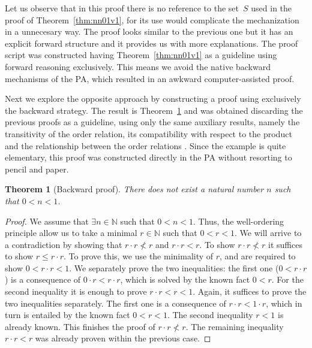 \documentclass[11pt,letterpaper]{article}
\newtheorem{theorem}{Theorem}
\begin{document}
Let us observe that in this proof there is no reference to the set~$S$ used in 
the proof of Theorem~\ref{thm:nn01v1}, for its use would complicate the 
mechanization in a unnecesary way. 
The proof looks similar to the previous one but it has an explicit forward 
structure and it provides us with more explanations. The proof script was 
constructed having Theorem~\ref{thm:nn01v1} as a guideline using forward 
reasoning exclusively. This means we avoid the native backward mechanisms of 
the PA, which resulted in an awkward computer-assisted proof.

Next we explore the opposite approach by constructing a proof using 
exclusively the backward strategy. The result is Theorem~\ref{thm:nn01vb} and 
was obtained discarding the previous proofs as a guideline, using only the same 
auxiliary results, namely the transitivity of the order relation, 
its compatibility with respect to the product and the relationship between the 
order relations %
.
Since the example is quite elementary, this proof was constructed directly in 
the PA without resorting to pencil and paper.


\begin{theorem}[Backward proof]\label{thm:nn01vb}
  There does not exist a natural number $n$ such that $0<n<1$.
\end{theorem}
\begin{proof}
  We assume that $\exists n\in\mathbb{N}$ such that $0<n<1$. Thus, the 
well-ordering principle allow us to take a minimal $r\in\mathbb{N}$ such that 
$0<r<1$.
We will arrive to a contradiction by showing that $r\cdot r \not < r$ and
  $r\cdot r < r$. To show $r\cdot r \not < r$ 
  it suffices to show $r\leq r\cdot r$. 
  To prove this, we use the minimality of $r$, and are required to show 
  $0<r\cdot r < 1$. 
  We separately prove the two inequalities: 
  the first one ($0<r\cdot r$) is a consequence of $0\cdot r< r\cdot r$, 
  which is solved by the known fact $0<r$. 
  For the second inequality it is enough to prove $r\cdot r < r < 1$. 
  Again, it suffices to prove the two inequalities separately. 
  The first one is a consequence of $r\cdot r < 1\cdot r$, which in turn is 
  entailed by the known fact $0<r<1$. 
  The second inequality $r<1$ is already known. 
  This finishes the proof of $r\cdot r\not < r$. 
  The remaining inequality $r\cdot r < r$ was already proven within the
  previous case. 
 \end{proof}
\end{document}
